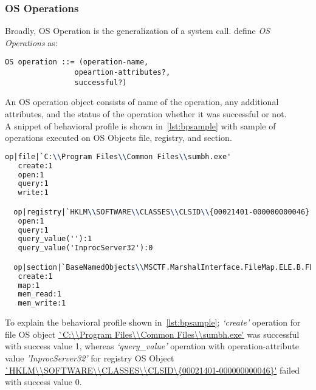 \subsubsection{OS Operations}
\label{ssub:OS Operations}
Broadly, OS Operation is the generalization of a system call.
\citeauthor{bayer} define \emph{OS Operations} as:
\begin{lstlisting}[numbers=none]
OS operation ::= (operation-name,
                opeartion-attributes?,
                successful?)
\end{lstlisting}
An OS operation object consists of name of the operation, any additional attributes, and the status of the operation whether it was successful or not.\\
A snippet of behavioral profile is shown in~\autoref{lst:bpsample} with sample of operations executed on OS Objects file, registry, and section.
\begin{lstlisting}[numbers=none,language=TeX,caption={Behvaioral Profile sample}, label={lst:bpsample}]
  op|file|`C:\\Program Files\\Common Files\\sumbh.exe'
   create:1
   open:1
   query:1
   write:1

  op|registry|`HKLM\\SOFTWARE\\CLASSES\\CLSID\\{00021401-000000000046}'
   open:1
   query:1
   query_value(''):1
   query_value('InprocServer32'):0

  op|section|`BaseNamedObjects\\MSCTF.MarshalInterface.FileMap.ELE.B.FLKMG'
   create:1
   map:1
   mem_read:1
   mem_write:1
\end{lstlisting}
To explain the behavioral profile shown in~\autoref{lst:bpsample}; \textit{`create'} operation for file OS object \url{`C:\\Program Files\\Common Files\\sumbh.exe'} was successful with success value 1, whereas \textit{`query\_value'} operation with operation-attribute value \emph{'InprocServer32'} for registry OS Object \url{`HKLM\\SOFTWARE\\CLASSES\\CLSID\\{00021401-000000000046}'} failed with success value 0. %
\\

